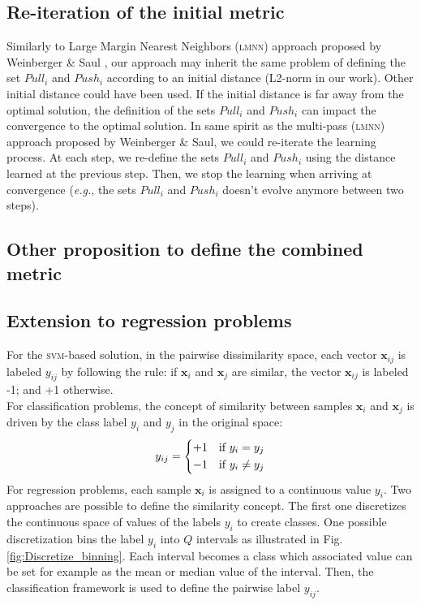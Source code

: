 \subsection*{Re-iteration of the initial metric}
Similarly to Large Margin Nearest Neighbors (\textsc{lmnn}) approach proposed by Weinberger \& Saul \cite{Weinberger2009a}, our approach may inherit the same problem of defining the set $Pull_i$ and $Push_i$ according to an initial distance (L2-norm in our work). Other initial distance could have been used. If the initial distance is far away from the optimal solution, the definition of the sets $Pull_i$ and $Push_i$ can impact the convergence to the optimal solution. In same spirit as the multi-pass (\textsc{lmnn}) approach proposed by Weinberger \& Saul, we could re-iterate the learning process. At each step, we re-define the sets $Pull_i$ and $Push_i$ using the distance learned at the previous step. Then, we stop the learning when arriving at convergence (\textit{e.g.}, the sets $Pull_i$ and $Push_i$ doesn't evolve anymore between two steps).

\subsection*{Other proposition to define the combined metric}

\subsection*{Extension to regression problems}
For the \textsc{svm}-based solution, in the pairwise dissimilarity space, each vector $\textbf{x}_{ij}$ is labeled $y_{ij}$ by following the rule: if $\textbf{x}_i$ and $\textbf{x}_j$ are similar, the vector $\textbf{x}_{ij}$ is labeled -1; and +1 otherwise. \\
For classification problems, the concept of similarity between samples $\textbf{x}_i$ and $\textbf{x}_j$ is driven by the class label $y_i$ and $y_j$ in the original space:
\begin{equation}
y_{ij} = 
\left\{
\begin{split}
+1 \text{\quad if } y_i = y_j\\ 
-1 \text{\quad if } y_i \neq y_j
\end{split}
\right.
\end{equation}
For regression problems, each sample $\textbf{x}_i$ is assigned to a continuous value $y_i$. Two approaches are possible to define the similarity concept. The first one discretizes the continuous space of values of the labels $y_i$ to create classes. One possible discretization bins the label $y_i$ into $Q$ intervals as illustrated in Fig. \ref{fig:Discretize_binning}. Each interval becomes a class which associated value can be set for example as the mean or median value of the interval. Then, the classification framework is used to define the pairwise label $y_{ij}$.

